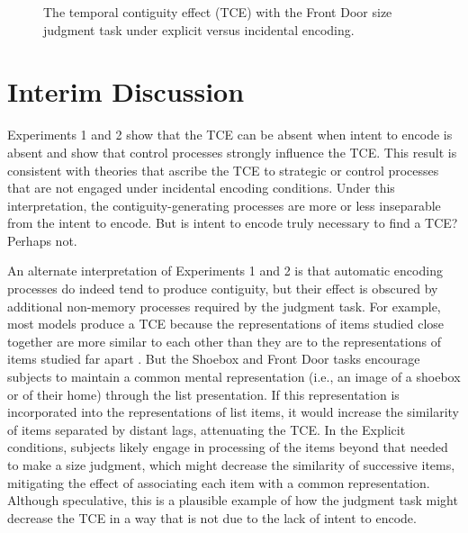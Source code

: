 \documentclass[jou,natbib]{apa6} %
\begin{document}
\begin{figure*}%
\caption{The temporal contiguity effect (TCE) with the Front Door size judgment task under explicit versus incidental encoding. \paneltext}
\label{door}
\end{figure*}

\section{Interim Discussion}

Experiments 1 and 2 show that the TCE can be absent when intent to encode is absent and show that control processes strongly influence the TCE. This result is consistent with theories that ascribe the TCE to strategic or control processes that are not engaged under incidental encoding conditions. Under this interpretation, the contiguity-generating processes are more or less inseparable from the intent to encode. But is intent to encode truly necessary to find a TCE? Perhaps not.

 An alternate interpretation of Experiments 1 and 2 is that automatic encoding processes do indeed tend to produce contiguity, but their effect is obscured by additional non-memory processes required by the judgment task. For example, most models produce a TCE because the representations of items studied close together are more similar to each other than they are to the representations of items studied far apart  \citep{}. But the Shoebox and Front Door tasks encourage subjects to maintain a common mental representation (i.e., an image of a shoebox or of their home) through the list presentation. If this representation is incorporated into the representations of list items, it would increase the similarity of items separated by distant lags, attenuating the TCE. In the Explicit conditions, subjects likely engage in processing of the items beyond that needed to make a size judgment, which might decrease the similarity of successive items, mitigating the effect of associating each item with a common representation. Although speculative, this is a plausible example of how the judgment task might decrease the TCE in a way that is not due to the lack of intent to encode. %

\end{document}
